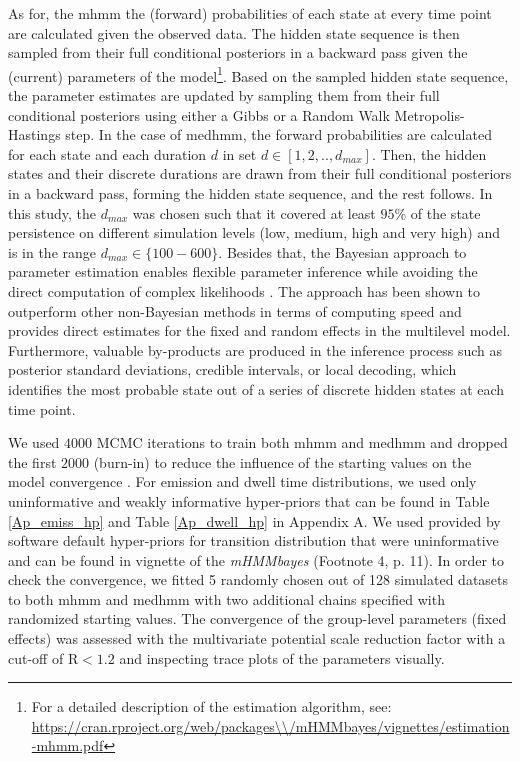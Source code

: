 As for, the \ac{mhmm} the (forward) probabilities of each state at every time point are calculated given the observed data. The hidden state sequence is then sampled from their full conditional posteriors in a backward pass given the (current) parameters of the model\footnote{For a detailed description of the estimation algorithm, see: \url{https://cran.rproject.org/web/packages\\/mHMMbayes/vignettes/estimation-mhmm.pdf}}. Based on the sampled hidden state sequence, the parameter estimates are updated by sampling them from their full conditional posteriors using either a Gibbs or a Random Walk Metropolis-Hastings step. In the case of \ac{medhmm}, the forward probabilities are calculated for each state and each duration $d$ in set $d\in[1,2,..,d_{max}]$. Then, the hidden states and their discrete durations are drawn from their full conditional posteriors in a backward pass, forming the hidden state sequence, and the rest follows. In this study, the $d_{max}$ was chosen such that it covered at least $95\%$ of the state persistence on different simulation levels (low, medium, high and very high) and is in the range $d_{max}\in\{100-600\}$. Besides that, the Bayesian approach to parameter estimation enables flexible parameter inference while avoiding the direct computation of complex likelihoods \citep{Frühwirth-Schnatter_2001,Scott_2002}. The approach has been shown to outperform other non-Bayesian methods in terms of computing speed \citep{Rydén_2008} and provides direct estimates for the fixed and random effects in the multilevel model. Furthermore, valuable by-products are produced in the inference process such as posterior standard deviations, credible intervals, or local decoding, which identifies the most probable state out of a series of discrete hidden states at each time point. 

We used $4000$ MCMC iterations to train both \ac{mhmm} and \ac{medhmm} and dropped the first $2000$ (burn-in) to reduce the influence of the starting values on the model convergence \citep{plummer2006coda}.
For emission and dwell time distributions, we used only uninformative and weakly informative hyper-priors that can be found in Table \ref{Ap_emiss_hp} and Table \ref{Ap_dwell_hp} in Appendix A. We used provided by software default hyper-priors for transition distribution that were uninformative and can be found in vignette of the \emph{mHMMbayes} \linebreak (Footnote 4, p. 11). In order to check the convergence, we fitted 5 randomly chosen out of 128 simulated datasets to both \ac{mhmm} and \ac{medhmm} with two additional chains specified with randomized starting values. The convergence of the group-level parameters (fixed effects) was assessed with the multivariate potential scale reduction factor \citep{Brooks_Gelman_1998} with a cut-off of ${\text{R} < 1.2}$ and inspecting trace plots of the parameters visually.

